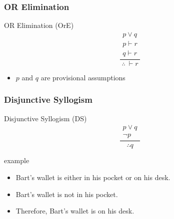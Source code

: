 \documentclass[dvipsnames]{beamer}
\begin{document}
\begin{frame}
  \frametitle{OR Elimination}

  \begin{block}{OR Elimination (OrE)}
    \[
    \frac
      {
        \begin{array}{c}
          p \vee q\\
          p \vdash r\\
          q \vdash r
        \end{array}
      }
      {
        \therefore ~ \vdash r
      }
    \]
  \end{block}

  \begin{itemize}
    \item $p$ and $q$ are provisional assumptions
  \end{itemize}
\end{frame}

\begin{frame}
  \frametitle{Disjunctive Syllogism}

  \begin{block}{Disjunctive Syllogism (DS)}
    \[
    \frac
      {
        \begin{array}{c}
          p \vee q\\
          \neg p
        \end{array}
      }
      {
        \therefore q
      }
    \]
  \end{block}

  \pause
  \begin{exampleblock}{example}
    \begin{itemize}
      \item Bart's wallet is either in his pocket or on his desk.
      \item Bart's wallet is not in his pocket.

      \medskip
      \item Therefore, Bart's wallet is on his desk.
    \end{itemize}
  \end{exampleblock}
\end{frame}
\end{document}
